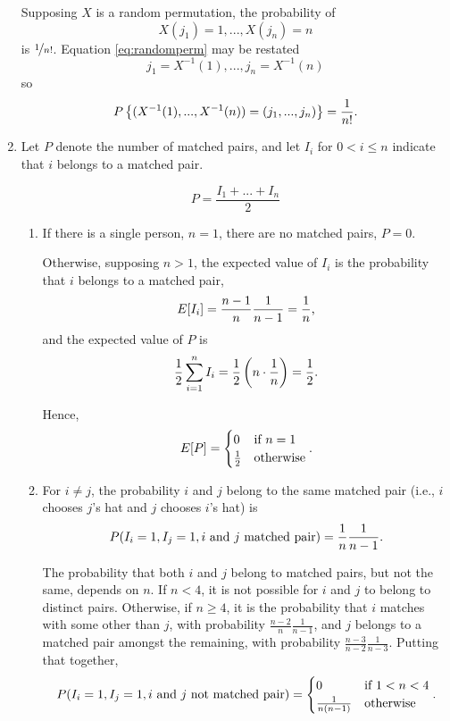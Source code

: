 \documentclass{article}
\begin{document}
\begin{enumerate}
    Supposing $X$ is a random permutation, the probability of
    \begin{equation}\label{eq:randomperm}X(j_1)=1, ..., X(j_n)=n \end{equation}
    is $\nicefrac{1}{n!}$.
    Equation \eqref{eq:randomperm} may be restated
    \[ j_1 = X^{-1}(1), ..., j_n = X^{-1}(n) \]
    so
    \[ P\left\{( X^{-1}(1), ..., X^{-1}(n) ) = (j_1, ..., j_n)\right\} = \frac{1}{n!} \text. \]
\item
    Let $P$ denote the number of matched pairs, and let $I_i$ for $0 < i \leq n$ indicate that $i$ belongs to a matched pair.

    \[ P = \frac{I_1 + ... + I_n}{2} \]

    \begin{enumerate}
    \item
        If there is a single person, $n=1$, there are no matched pairs, $P=0$.

        Otherwise, supposing $n>1$, the expected value of $I_i$ is the probability that $i$ belongs to a matched pair,
        \[ E[I_i] = \frac{n-1}{n}\frac{1}{n-1} = \frac{1}{n} \text, \]
        and the expected value of $P$ is
        \[ \frac{1}{2}\sum_{i=1}^n I_i = \frac{1}{2}\left( n \cdot \frac{1}{n} \right) = \frac{1}{2} \text.  \]

        Hence,
        \[ E[P] =
            \begin{cases}
                0 & \text{if } n=1 \\
                \frac{1}{2} & \text{otherwise}
            \end{cases} \text.
        \]
    \item
        For $i \neq j$, the probability $i$ and $j$ belong to the same matched pair (i.e., $i$ chooses $j$'s hat and $j$ chooses $i$'s hat) is
        \[ P(I_i=1,I_j=1,i \text{ and } j \text{ matched pair}) = \frac{1}{n}\frac{1}{n-1} \text. \]

        The probability that both $i$ and $j$ belong to matched pairs, but not the same, depends on $n$. If $n<4$,
        it is not possible for $i$ and $j$ to belong to distinct pairs. Otherwise, if $n \geq 4$, it
        is the probability that $i$ matches with some other than $j$, with probability $\frac{n-2}{n}\frac{1}{n-1}$,
        and $j$ belongs to a matched pair amongst the remaining, with probability $\frac{n-3}{n-2}\frac{1}{n-3}$.
        Putting that together,
        \[ P(I_i=1,I_j=1,i \text{ and } j \text{ not matched pair}) =
                \begin{cases}
                    0 & \text{if } 1 < n < 4 \\
                    \frac{1}{n(n-1)} & \text{otherwise}
                \end{cases} \text.
        \]


\end{enumerate}
\end{enumerate}
\end{document}
